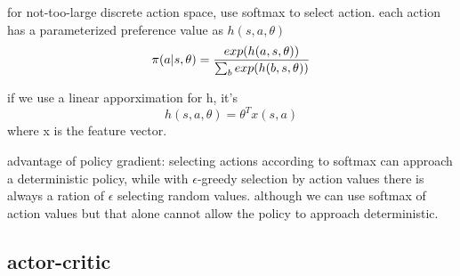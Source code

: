 \documentclass[10pt,a4paper]{book}
\begin{document}
for not-too-large discrete action space, use softmax to select action. each action has a parameterized preference value as $h(s,a,\theta)$
$$\pi(a|s,\theta) = {{exp(h(a,s,\theta))}\over{\sum_b{exp(h(b,s,\theta))}}}$$

if we use a linear apporximation for h, it's
$$h(s,a,\theta) = \theta^Tx(s,a)$$
where x is the feature vector.

advantage of policy gradient: selecting actions according to softmax can approach a deterministic policy, while with $\epsilon$-greedy selection by action values there is always a ration of $\epsilon$ selecting random values.
although we can use softmax of action values but that alone cannot allow the policy to approach deterministic.

\subsection {actor-critic}
\end{document}
